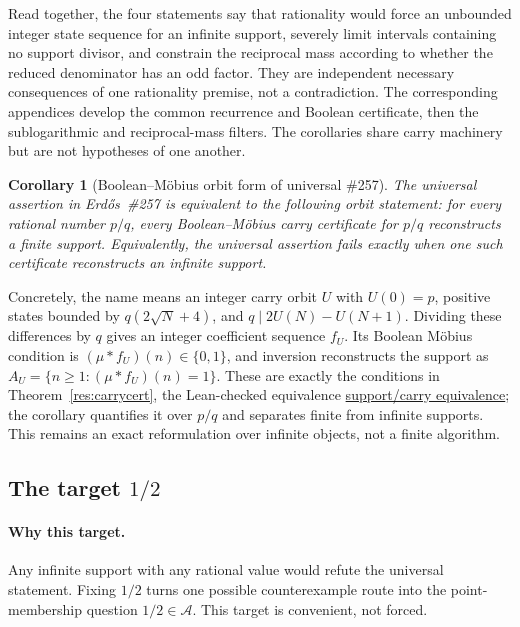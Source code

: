 \documentclass[11pt]{article}
\newcommand{\commit}{99f4bf47422abbd8757cbb22b50ba079d764d3a7}
\newcommand{\repobase}{https://github.com/wcook04/plectis-erdos/blob/\commit}
\newcommand{\PK}{Erdos249257}
\newcommand{\lword}[4]{\href{\repobase/\PK/#1\#L#2}{#4}}
\newtheorem{corollary}[theorem]{Corollary}
\theoremstyle{definition}
\theoremstyle{remark}
\begin{document}
Read together, the four statements say that rationality would force an
unbounded integer state sequence for an infinite support, severely limit
intervals containing no support divisor, and constrain the reciprocal mass
according to whether the reduced denominator has an odd factor.  They are
independent necessary consequences of one rationality premise, not a
contradiction.
The corresponding appendices develop the common recurrence and Boolean
certificate, then the sublogarithmic and reciprocal-mass filters.  The
corollaries share carry machinery but are not hypotheses of one another.

\begin{corollary}[Boolean--M\"obius orbit form of universal \#257]
\label{res:universal-boolean-obstruction}
The universal assertion in Erd\H{o}s~\#257 is equivalent to the following
orbit statement: for every rational number \(p/q\), every
Boolean--M\"obius carry certificate for \(p/q\) reconstructs a finite
support.  Equivalently, the universal assertion fails exactly when one such
certificate reconstructs an infinite support.
\end{corollary}
\noindent Concretely, the name means an integer carry orbit \(U\) with
\(U(0)=p\), positive states bounded by \(q(2\sqrt N+4)\), and
\(q\mid 2U(N)-U(N+1)\).  Dividing these differences by \(q\) gives an
integer coefficient sequence \(f_U\).  Its Boolean M\"obius condition is
\((\mu*f_U)(n)\in\{0,1\}\), and inversion reconstructs the support as
\(A_U=\{n\geq1:(\mu*f_U)(n)=1\}\).  These are exactly the conditions in
Theorem~\ref{res:carrycert}, the Lean-checked equivalence
\lword{BooleanMobiusCarry.lean}{949}{exists_normalized_support_fraction_iff_exists_booleanMobiusCarry}{support/carry equivalence};
the corollary quantifies it over \(p/q\) and separates finite from infinite
supports.  This remains an exact reformulation over infinite objects, not a
finite algorithm.

\subsection{The target \(1/2\)}

\paragraph{Why this target.}
Any infinite support with any rational value would refute the universal
statement.  Fixing \(1/2\) turns one possible counterexample route into the
point-membership question \(1/2\in\mathcal A\).  This target is convenient,
not forced.
\end{document}

